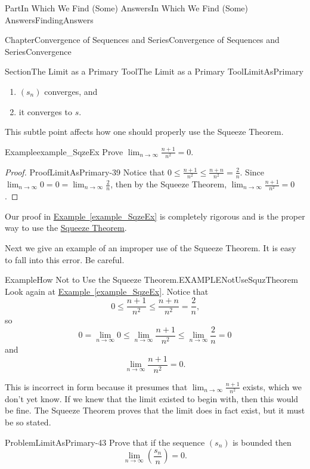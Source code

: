 \documentclass[oneside,10pt,]{book}
\newcommand{\xreffont}{\relax}
\numberwithin{equation}{part}
\def\limit#1#2#3{{\displaystyle\lim_{#1\rightarrow #2}#3}}
\def\limitt#1#2#3{{\displaystyle\lim_{#1\rightarrow #2}\textstyle #3}}
\begin{document}
\begin{partptx}{Part}{In Which We Find (Some) Answers}{}{In Which We Find (Some) Answers}{}{}{FindingAnswers}
\begin{chapterptx}{Chapter}{Convergence of Sequences and Series}{}{Convergence of Sequences and Series}{}{}{Convergence}
\begin{sectionptx}{Section}{The Limit as a Primary Tool}{}{The Limit as a Primary Tool}{}{}{LimitAsPrimary}
\begin{enumerate}
\item{}\(\left(s_n\right)\) converges, and%
\item{}it converges to \(s\).%
\end{enumerate}
This subtle point affects how one should properly use the Squeeze Theorem.%
\begin{example}{Example}{}{example_SqzeEx}%
Prove \(\limit{n}{\infty}{\frac{n+1}{n^2}}=0\).%
\end{example}
\begin{proof}{Proof}{}{LimitAsPrimary-39}
Notice that \(0\leq\frac{n+1}{n^2}\leq\frac{n+n}{n^2}=\frac{2}{n}\). Since \(\limit{n}{\infty}{0}=0=\limit{n}{\infty}{\frac{2}{n}}\), then by the Squeeze Theorem, \(\limit{n}{\infty}{\frac{n+1}{n^2}}=0\).%
\end{proof}
Our proof in \hyperref[example_SqzeEx]{Example~{\xreffont\ref{example_SqzeEx}}} is completely rigorous and is the proper way to use the \hyperref[thm_SqueezeTheorem]{Squeeze Theorem}.%
\par
Next we give an example of an improper use of the Squeeze Theorem. It is easy to fall into this error. Be careful.%
\begin{example}{Example}{How Not to Use the Squeeze Theorem.}{EXAMPLENotUseSquzTheorem}%
Look again at  \hyperref[example_SqzeEx]{Example~{\xreffont\ref{example_SqzeEx}}}. Notice that%
\begin{equation*}
0\leq\frac{n+1}{n^2}\leq\frac{n+n}{n^2}=\frac{2}{n}\text{,}
\end{equation*}
so%
\begin{equation*}
0=\limit{n}{\infty}{0} \leq \limit{n}{\infty}{\frac{n+1}{n^2}}\leq\limit{n}{\infty}{\frac{2}{n}}=0
\end{equation*}
and%
\begin{equation*}
\limit{n}{\infty}{\frac{n+1}{n^2}}=0\text{.}
\end{equation*}
%
\par
This is incorrect in form because it presumes that \(\limitt{n}{\infty}{\frac{n+1}{n^2}}\) exists, which we don't yet know. If we knew that the limit existed to begin with, then this would be fine. The Squeeze Theorem proves that the limit does in fact exist, but it must be so stated.%
\end{example}
\begin{problem}{Problem}{}{LimitAsPrimary-43}%
Prove that if the sequence \(\left(s_n\right)\) is bounded then%
\begin{equation*}
\limit{n}{\infty}{\left(\frac{s_n}{n}\right)}=0\text{.}
\end{equation*}

\end{problem}
\end{sectionptx}
\end{chapterptx}
\end{partptx}
\end{document}
